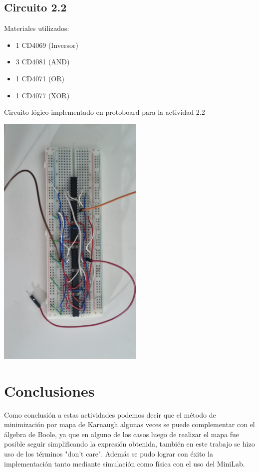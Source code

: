 \saltoPag

\subsection{Circuito 2.2}

    Materiales utilizados:
    \begin{itemize}
        \item 1 CD4069 (Inversor)
        \item 3 CD4081 (AND)
        \item 1 CD4071 (OR)
        \item 1 CD4077 (XOR)
    \end{itemize}
Circuito lógico implementado en protoboard para la actividad 2.2
    \begin{center}
        \includegraphics[width=7cm]{imagenes/Circuito2.jpg}
        \end{center}

        \section{Conclusiones}

        Como conclusión a estas actividades podemos decir que el método de minimización por mapa de Karnaugh algunas veces se puede complementar con el álgebra de Boole, ya que en alguno de los casos luego de realizar el mapa fue posible seguir simplificando la expresión obtenida, también en este trabajo se hizo uso de los términos "don't care". Además se pudo lograr con éxito la implementación tanto mediante simulación como física con el uso del MiniLab.
    
